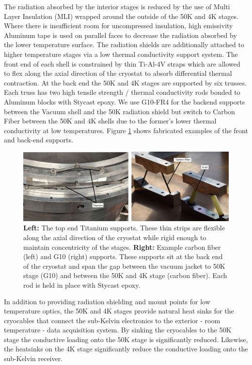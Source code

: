 \documentclass[]{spie}  %
\begin{document}
The radiation absorbed by the interior stages is reduced by the use of Multi
Layer Insulation (MLI) wrapped around the outside of the 50K and 4K stages. Where
there is insufficient room for uncompressed insulation, high emissivity
Aluminum tape is used on parallel faces to decrease the radiation absorbed by the lower
temperature surface. The radiation shields are additionally attached to higher temperature stages
via a low thermal conductivity support system. The front end of each shell is
constrained by thin Ti-Al-4V straps which are allowed to flex along the axial
direction of the cryostat to absorb differential thermal contraction. At the
back end the 50K and 4K stages are supported by six trusses. Each truss has two high
tensile strength / thermal conductivity rods bonded to Aluminum blocks with
Stycast epoxy. We use G10-FR4 for the backend supports between the Vacuum
shell and the 50K radiation shield but switch to Carbon Fiber between the 50K
and 4K shells due to the former's lower thermal conductivity at low
temperatures. Figure \ref{fig:supports} shows fabricated examples of the
front and back-end supports.

\begin{figure}[t]
	\center
	\includegraphics[scale=0.1]{supports.png}
	\caption{\textbf{Left:} The top end Titanium supports. These thin strips
	are flexible along the axial direction of the cryostat while rigid enough
	to maintain concentricity of the stages. \textbf{Right:} Example carbon fiber (left) and G10 (right) supports. These
	supports sit at the back end of the cryostat and span the gap between the
	vacuum jacket to 50K stage (G10) and between the 50K and 4K stage (carbon
	fiber). Each rod is held in place with Stycast epoxy.}
	\label{fig:supports}
\end{figure}



In addition to providing radiation shielding and mount points for low
temperature optics, the 50K and 4K stages provide natural heat sinks for the
cryocables that connect the sub-Kelvin electronics to the exterior - room
temperature - data acquisition system. By sinking the cryocables to the 50K
stage the conductive loading onto the 50K stage is significantly reduced.
Likewise, the heatsinks on the 4K stage significantly reduce the conductive
loading onto the sub-Kelvin receiver. 
\end{document}
